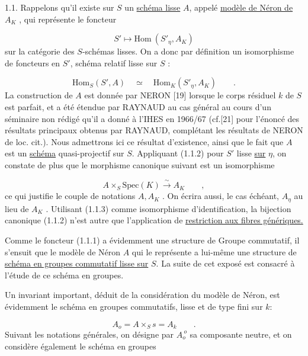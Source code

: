 1.1. Rappelons qu'il existe sur $S$ un \underline{schéma lisse} $A$, appelé \underline{modèle de Néron de} $A_K$ , qui représente le foncteur

\begin{equation}\tag{1.1.1}
S' \longmapsto \mathrm{Hom}\ (S'_\eta,A_K)
\end{equation}
sur la catégorie des $S$-schémas lisses. On a donc par définition un isomorphisme de foncteurs en $S'$, schéma relatif lisse sur $S$ :

\begin{equation}\tag{1.1.2}
\mathrm{Hom}_S(S',A) \quad \simeq \quad \mathrm{Hom}_K(S'_\eta,A_K) \qquad .
\end{equation}
La construction de $A$ est donnée par NERON [19] lorsque le corps résiduel $k$ de $S$ est parfait, et a été étendue par RAYNAUD au cas général au cours d'un séminaire non rédigé qu'il a donné à l'IHES en 1966/67 (cf.[21] pour l'énoncé des résultats principaux obtenus par RAYNAUD, complétant les résultats de NERON de loc. cit.). Nous admettrons ici ce résultat d'existence, ainsi que le fait que $A$ est un \underline{schéma} quasi-projectif sur $S$. Appliquant (1.1.2) pour $S'$ lisse \underline{sur} $\eta$, on constate de plus que le morphisme canonique suivant est un isomorphisme

\begin{equation}\tag{1.1.3}
A \times_S \mathrm{Spec}(K) \xrightarrow{\ \sim\ } A_K \qquad ,
\end{equation}
ce qui justifie le couple de notations $A,A_K$ . On écrira aussi, le cas échéant, $A_\eta$ au lieu de $A_K$ . Utilisant (1.1.3) comme isomorphisme d'identification, la bijection canonique (1.1.2) n'est autre que l'application de \underline{restriction aux fibres génériques.}

Comme le foncteur (1.1.1) a évidemment une structure de Groupe commutatif, il s'ensuit que le modèle de Néron $A$ qui le représente a lui-même une structure de \underline{schéma en groupes commutatif lisse sur} $S$. La suite de cet exposé est consacré à l'étude de ce schéma en groupes.



Un invariant important, déduit de la considération du modèle de Néron, est évidemment le schéma en groupes commutatifs, lisse et de type fini sur $k$:

\begin{equation}\tag{1.1.4}
A_o = A \times_S s = A_k \qquad .
\end{equation}
Suivant les notations générales, on désigne par $A_o^{\ o}$ sa composante neutre, et on considère également le schéma en groupes

